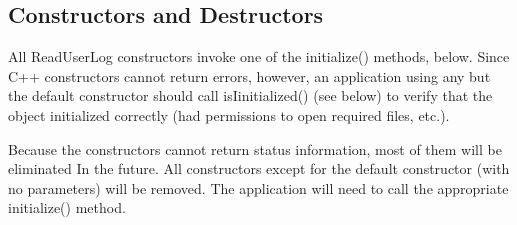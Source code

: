 \subsection{Constructors and Destructors}
All ReadUserLog constructors invoke one of the initialize() methods,
below.  Since C++ constructors cannot return errors, however, an
application using any but the default constructor should call
isIinitialized() (see below) to verify that the object initialized
correctly (had permissions to open required files, etc.).

\Note Because the constructors cannot return status information, most of
them will be eliminated In the future.  All constructors except for
the default constructor (with no parameters) will be removed.
The application will need to call the appropriate initialize() method.

